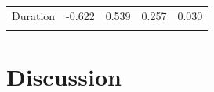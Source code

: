 \begin{table}[ht]
\begin{tabular}{lrrrr}
        Duration & -0.622 & 0.539 & 0.257 & 0.030 \\ 
        \lspbottomrule
    \end{tabular}
\end{table}

\section{Discussion} \label{sec:acousticlandscape:discussion}

